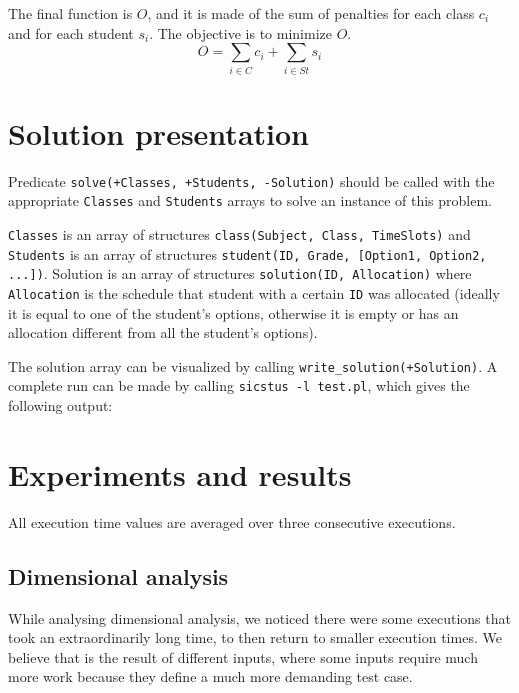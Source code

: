 \documentclass[runningheads]{llncs}
\begin{document}
The final function is $O$, and it is made of the sum of penalties for each class $c_i$ and for each student $s_i$. The objective is to minimize $O$.
\begin{equation} 
    O = \sum_{i \in C}{c_i} + \sum_{i \in St}{s_i}
\end{equation}

\section{Solution presentation}

Predicate \texttt{solve(+Classes, +Students, -Solution)} should be called with the appropriate \texttt{Classes} and \texttt{Students} arrays to solve an instance of this problem.

\texttt{Classes} is an array of structures \texttt{class(Subject, Class, TimeSlots)} and \texttt{Students} is an array of structures \texttt{student(ID, Grade, [Option1, Option2, ...])}. Solution is an array of structures \texttt{solution(ID, Allocation)} where \texttt{Allocation} is the schedule that student with a certain \texttt{ID} was allocated (ideally it is equal to one of the student's options, otherwise it is empty or has an allocation different from all the student's options).

The solution array can be visualized by calling \texttt{write\_solution(+Solution)}. A complete run can be made by calling \texttt{sicstus -l test.pl}, which gives the following output:



\section{Experiments and results}

All execution time values are averaged over three consecutive executions.

\subsection{Dimensional analysis}

While analysing dimensional analysis, we noticed there were some executions that took an extraordinarily long time, to then return to smaller execution times. We believe that is the result of different inputs, where some inputs require much more work because they define a much more demanding test case.
\end{document}

